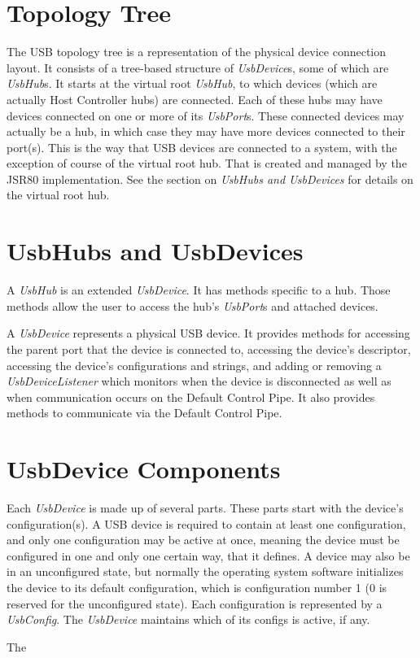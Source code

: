 \documentclass{article}
\newcommand{\name}[1]{\emph{#1}}
\newcommand{\secname}[1]{\emph{#1}}
\begin{document}
%

\section{Topology Tree}

The USB topology tree is a representation of the physical device connection layout.  It
consists of a tree-based structure of \name{UsbDevice}s, some of which are \name{UsbHub}s.
It starts at the virtual root \name{UsbHub}, to which devices (which are actually
Host Controller hubs) are connected.  Each of these hubs may have devices connected on one or
more of its \name{UsbPort}s.  These connected devices may actually be a hub, in which case they
may have more devices connected to their port(s).  This is the way that USB devices are connected
to a system, with the exception of course of the virtual root hub.  That is created and managed
by the JSR80 implementation.  See the section on \secname{UsbHubs and UsbDevices} for details on
the virtual root hub.

%

\section{UsbHubs and UsbDevices}

A \name{UsbHub} is an extended \name{UsbDevice}.  It has methods specific to a hub.  Those
methods allow the user to access the hub's \name{UsbPort}s and attached devices.  

A \name{UsbDevice} represents a physical USB device.  It provides methods for accessing the
parent port that the device is connected to, accessing the device's descriptor, accessing
the device's configurations and strings, and adding or removing a \name{UsbDeviceListener}
which monitors when the device is disconnected as well as when communication occurs on the
Default Control Pipe.  It also provides methods to communicate via the Default Control Pipe.

%

\section{UsbDevice Components}

Each \name{UsbDevice} is made up of several parts.  These parts start with the device's
configuration(s).  A USB device is required to contain at least one configuration, and
only one configuration may be active at once, meaning the device must be configured
in one and only one certain way, that it defines.  A device may also be in an unconfigured
state, but normally the operating system software initializes the device to its default
configuration, which is configuration number 1 (0 is reserved for the unconfigured state).
Each configuration is represented by a \name{UsbConfig}.  The \name{UsbDevice} maintains which
of its configs is active, if any.

The 
\end{document}

